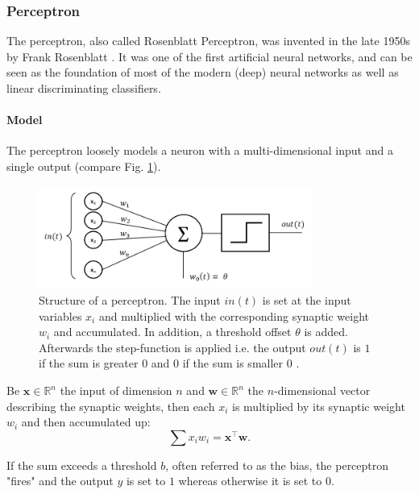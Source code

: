 \subsubsection{Perceptron} \label{c:perceptron}

The perceptron, also called Rosenblatt Perceptron, was invented in the late 1950s by Frank Rosenblatt \cite{rosenblatt1958perceptron}. 
It was one of the first artificial neural networks, and can be seen as the foundation of most of the modern (deep) neural networks as well as linear discriminating classifiers. 

\paragraph{Model} \label{c:permodel}

The perceptron loosely models a neuron with a multi-dimensional input and a single output (compare Fig. \ref{fig:perceptron}). 

\begin{figure}
	\centering
    	\includegraphics[width=0.8\textwidth]{imgs/percept.png} 
    \caption[Structure of a perceptron.]{Structure of a perceptron. The input $in(t)$ is set at the input variables $x_i$ and multiplied with the corresponding synaptic weight $w_i$ and accumulated. In addition, a threshold offset $\theta$ is added. Afterwards the step-function is applied i.e. the output $out(t)$ is $1$ if the sum is greater $0$ and $0$ if the sum is smaller $0$ \cite{perceptronImg}.}
	\label{fig:perceptron}
\end{figure}

Be $\textbf{x} \in \mathbb{R}^n$ the input of dimension $n$ and $\textbf{w}\in \mathbb{R}^n$ the $n$-dimensional vector describing the synaptic weights, then each $x_i$ is multiplied by its synaptic weight $w_i$ and then accumulated up:
\[
\sum x_i w_i = \textbf{x}^\intercal \textbf{w}.
\] 

If the sum exceeds a threshold $b$, often referred to as the bias, the perceptron "fires" and the output $y$ is set to $1$ whereas otherwise it is set to $0$.


